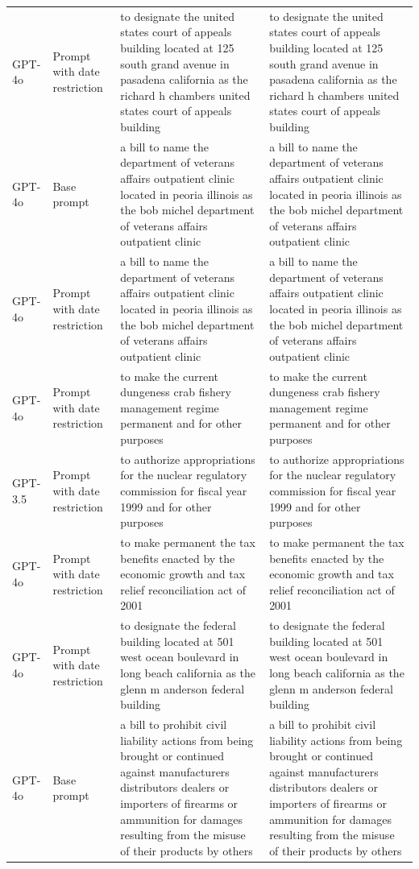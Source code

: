 \begin{longtable}{>{\raggedright\arraybackslash}p{1.4cm}>{\raggedright\arraybackslash}p{1.4cm}>{\raggedright\arraybackslash}p{5.5cm}>{\raggedright\arraybackslash}p{5.5cm}}
GPT-4o & Prompt with date restriction & to designate the united states court of appeals building located at 125 south grand avenue in pasadena california as the richard h chambers united states court of appeals building & to designate the united states court of appeals building located at 125 south grand avenue in pasadena california as the richard h chambers united states court of appeals building\\
GPT-4o & Base prompt & a bill to name the department of veterans affairs outpatient clinic located in peoria illinois as the bob michel department of veterans affairs outpatient clinic & a bill to name the department of veterans affairs outpatient clinic located in peoria illinois as the bob michel department of veterans affairs outpatient clinic\\
GPT-4o & Prompt with date restriction & a bill to name the department of veterans affairs outpatient clinic located in peoria illinois as the bob michel department of veterans affairs outpatient clinic & a bill to name the department of veterans affairs outpatient clinic located in peoria illinois as the bob michel department of veterans affairs outpatient clinic\\
GPT-4o & Prompt with date restriction & to make the current dungeness crab fishery management regime permanent and for other purposes & to make the current dungeness crab fishery management regime permanent and for other purposes\\
GPT-3.5 & Prompt with date restriction & to authorize appropriations for the nuclear regulatory commission for fiscal year 1999 and for other purposes & to authorize appropriations for the nuclear regulatory commission for fiscal year 1999 and for other purposes\\
GPT-4o & Prompt with date restriction & to make permanent the tax benefits enacted by the economic growth and tax relief reconciliation act of 2001 & to make permanent the tax benefits enacted by the economic growth and tax relief reconciliation act of 2001\\
GPT-4o & Prompt with date restriction & to designate the federal building located at 501 west ocean boulevard in long beach california as the glenn m anderson federal building & to designate the federal building located at 501 west ocean boulevard in long beach california as the glenn m anderson federal building\\
GPT-4o & Base prompt & a bill to prohibit civil liability actions from being brought or continued against manufacturers distributors dealers or importers of firearms or ammunition for damages resulting from the misuse of their products by others & a bill to prohibit civil liability actions from being brought or continued against manufacturers distributors dealers or importers of firearms or ammunition for damages resulting from the misuse of their products by others\\

\end{longtable}

